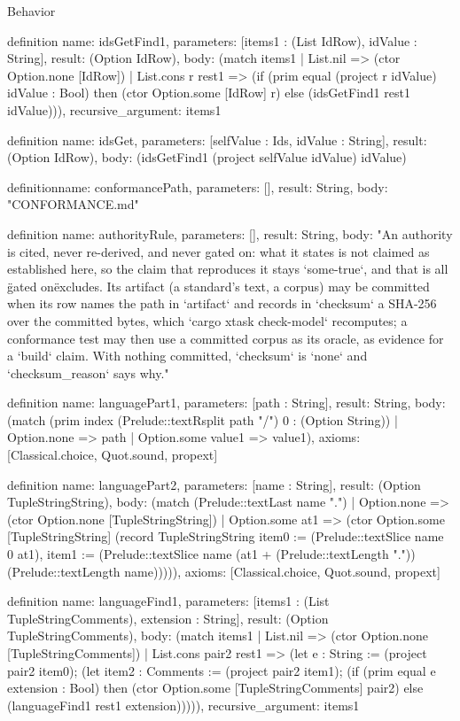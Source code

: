 \begin{lexlean}{Behavior}
\begin{semanticmodule}
definition{
  name: idsGetFind1,
  parameters: [items1 : (List IdRow), idValue : String],
  result: (Option IdRow),
  body: (match items1
    | List.nil => (ctor Option.none [IdRow])
    | List.cons r rest1 => (if (prim equal (project r idValue) idValue : Bool) then (ctor Option.some [IdRow] r) else (idsGetFind1 rest1 idValue))),
  recursive_argument: items1
}

definition{
  name: idsGet,
  parameters: [selfValue : Ids, idValue : String],
  result: (Option IdRow),
  body: (idsGetFind1 (project selfValue idValue) idValue)
}

definition{name: conformancePath, parameters: [], result: String, body: "CONFORMANCE.md"}

definition{
  name: authorityRule,
  parameters: [],
  result: String,
  body: "An authority is cited, never re-derived, and never gated on: what it states is not claimed as established here, so the claim that reproduces it stays `some-true`, and that is all \"gated on\" excludes. Its artifact (a standard's text, a corpus) may be committed when its row names the path in `artifact` and records in `checksum` a SHA-256 over the committed bytes, which `cargo xtask check-model` recomputes; a conformance test may then use a committed corpus as its oracle, as evidence for a `build` claim. With nothing committed, `checksum` is `none` and `checksum_reason` says why."
}

definition{
  name: languagePart1,
  parameters: [path : String],
  result: String,
  body: (match (prim index (Prelude::textRsplit path "/") 0 : (Option String))
    | Option.none => path
    | Option.some value1 => value1),
  axioms: [Classical.choice, Quot.sound, propext]
}

definition{
  name: languagePart2,
  parameters: [name : String],
  result: (Option TupleStringString),
  body: (match (Prelude::textLast name ".")
    | Option.none => (ctor Option.none [TupleStringString])
    | Option.some at1 => (ctor Option.some [TupleStringString] (record TupleStringString {item0 := (Prelude::textSlice name 0 at1), item1 := (Prelude::textSlice name (at1 + (Prelude::textLength ".")) (Prelude::textLength name))}))),
  axioms: [Classical.choice, Quot.sound, propext]
}

definition{
  name: languageFind1,
  parameters: [items1 : (List TupleStringComments), extension : String],
  result: (Option TupleStringComments),
  body: (match items1
    | List.nil => (ctor Option.none [TupleStringComments])
    | List.cons pair2 rest1 => (let e : String := (project pair2 item0); (let item2 : Comments := (project pair2 item1); (if (prim equal e extension : Bool) then (ctor Option.some [TupleStringComments] pair2) else (languageFind1 rest1 extension))))),
  recursive_argument: items1
}


\end{semanticmodule}
\end{lexlean}
